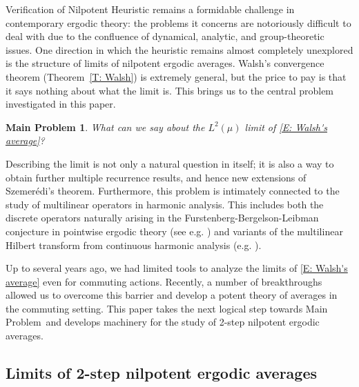 \documentclass[11pt]{amsart}
\newtheorem*{mproblem}{Main Problem}
\theoremstyle{definition}
\newcommand{\1}{{\mathbf{1}}}
\begin{document}
Verification of Nilpotent Heuristic remains a formidable challenge in contemporary ergodic theory: the problems it concerns are notoriously difficult to deal with due to the confluence of dynamical, analytic, and group-theoretic issues. One direction in which the heuristic remains almost completely unexplored is the structure of limits of nilpotent ergodic averages. Walsh's convergence theorem (Theorem~\ref{T: Walsh}) is extremely general, but the price to pay is that it says nothing about what the limit is. This brings us to the central problem investigated in this paper.
\begin{mproblem}%
    What can we say about the $L^2(\mu)$ limit of \eqref{E: Walsh's average}?
\end{mproblem}
Describing the limit is not only a natural question in itself; it is also a way to obtain further multiple recurrence results, and hence new extensions of Szemer\'edi's theorem. Furthermore, this problem is intimately connected to the study of multilinear operators in harmonic analysis. This includes both the discrete operators naturally arising in the Furstenberg-Bergelson-Leibman conjecture in pointwise ergodic theory (see e.g. \cite{KMPWW24, KMT20, Mirek26}) and variants of the multilinear Hilbert transform  from continuous harmonic analysis (e.g. \cite{CDR21, HL23, LT97, Tao16}).

Up to several years ago, we had limited tools to analyze the limits of \eqref{E: Walsh's average} even for commuting actions. Recently, a number of breakthroughs \cite{DFKS22, DKKST25, DKKST24, DKS22,DKS23,Fr21, FrKu22b, FrKu22a} allowed us to overcome this barrier and develop a potent theory of averages in the commuting setting. This paper takes the next logical step towards Main Problem~and develops machinery for the study of 2-step nilpotent ergodic averages. 



\subsection{Limits of 2-step nilpotent ergodic averages}
\end{document}
